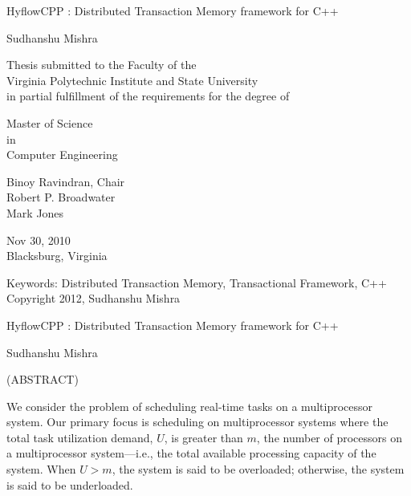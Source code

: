 \documentclass[12pt,dvips]{report}
\begin{document}
\thispagestyle{empty}
\begin{center}

{\Large 
HyflowCPP : Distributed Transaction Memory framework for C++
}

\vfill

Sudhanshu Mishra

\vfill

Thesis submitted to the Faculty of the \\
Virginia Polytechnic Institute and State University \\
in partial fulfillment of the requirements for the degree of

\vfill

Master of Science \\
in \\
Computer Engineering

\vfill

Binoy Ravindran, Chair \\
Robert P. Broadwater \\
Mark Jones

\vfill

Nov 30, 2010 \\
Blacksburg, Virginia

\vfill

Keywords: Distributed Transaction Memory, Transactional Framework, C++
\\
Copyright 2012, Sudhanshu Mishra

\end{center}

\pagebreak

\thispagestyle{empty}
\begin{center}

{\large
HyflowCPP : Distributed Transaction Memory framework for C++
}

\vfill

Sudhanshu Mishra

\vfill

(ABSTRACT)

\vfill

\end{center}

We consider the problem of scheduling real-time tasks on a multiprocessor system. Our primary focus is scheduling on multiprocessor systems where the total task utilization demand, $U$, is greater than 
$m$, the number of processors on a multiprocessor system---i.e., the total available processing capacity of the system. When $U > m$, the system is said to be overloaded; otherwise, the system is said to be underloaded.
\end{document}
